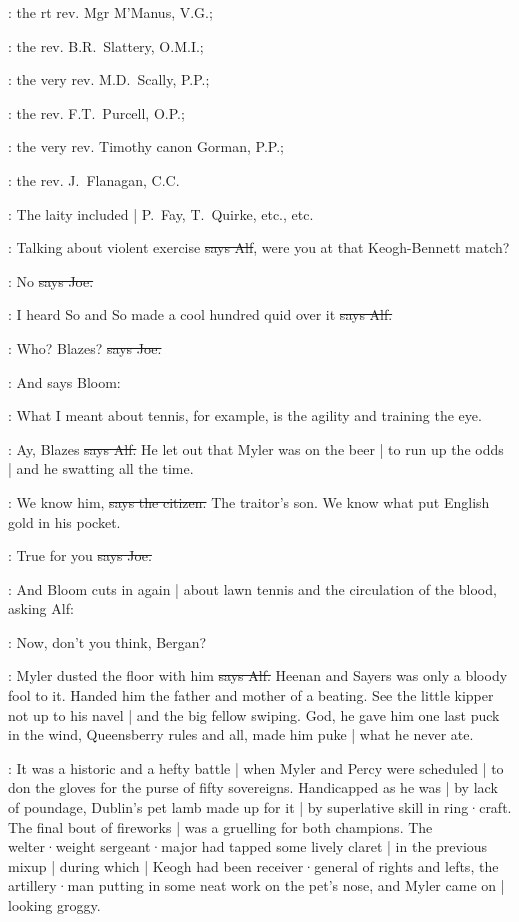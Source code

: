 :
the rt rev. Mgr M'Manus, V.G.;

:
the rev. B.R.~Slattery, O.M.I.;

:
the very rev. M.D.~Scally, P.P.;

:
the rev. F.T.~Purcell, O.P.;

:
the very rev. Timothy canon Gorman, P.P.;

:
the rev. J.~Flanagan, C.C.

:
The laity included |
P.~Fay,
T.~Quirke,
etc.,
etc.

\bergan:
Talking about violent exercise
\sout{says Alf},
were you at that Keogh-Bennett match?

\joe:
No
\sout{says Joe.}

\bergan:
I heard So and So made a cool hundred quid over it
\sout{says Alf.}

\joe:
Who?
Blazes?
\sout{says Joe.}

\Nq:
And says Bloom:

\Bloom:
What I meant about tennis,
for example,
is the agility and training the eye.

\bergan:
Ay,
Blazes
\sout{says Alf.}
He let out that Myler was on the beer |
to run up the odds |
and he swatting all the time.

\citizen:
We know him,
\sout{says the citizen.}
The traitor's son.
We know what put English gold in his pocket.

\joe:
True for you
\sout{says Joe.}

\Nq:
And Bloom cuts in again |
about lawn tennis and the circulation of the blood,
asking Alf:

\Bloom:
Now,
don't you think,
Bergan?

\bergan:
Myler dusted the floor with him
\sout{says Alf.}
Heenan and Sayers was only a bloody fool to it.
Handed him the father and mother of a beating.
See the little kipper not up to his navel |
and the big fellow swiping.
God,
he gave him one last puck in the wind,
Queensberry rules and all,
made him puke |
what he never ate.

:
It was a historic and a hefty battle
 |
when Myler and Percy were scheduled |
to don the gloves for the purse of fifty sovereigns.
Handicapped as he was |
by lack of poundage,
Dublin's pet lamb made up for it |
by superlative skill in ring·craft.
The final bout of fireworks |
was a gruelling for both champions.
The welter·weight sergeant·major had tapped some lively claret |
in the previous mixup |
during which |
Keogh had been receiver·general of rights and lefts,
the artillery·man putting in some neat work on the pet's nose,
and Myler came on |
looking groggy.


